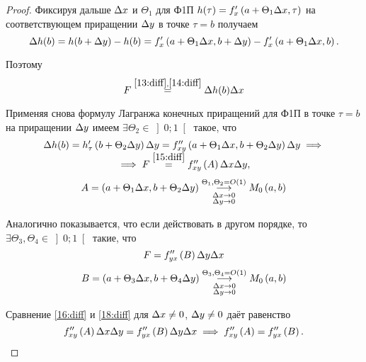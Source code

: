 \documentclass[../../main.tex]{subfiles}
\begin{document}
\begin{proof}
		Фиксируя дальше $\Delta x$ и $\Theta_1$ для Ф1П $h(\tau) = 
		f'_x\left(a+\Theta_1\Delta x, \tau\right)$ на соответствующем приращении 
		$\Delta y$ в точке $\tau = b$ получаем
		\begin{equation}
			\Delta h(b) = h(b + \Delta y) - h(b) = 
			f'_x\left(a + \Theta_1\Delta x, b + \Delta y\right) - 
			f'_x\left(a + \Theta_1\Delta x, b\right).
			\label{14:diff}
		\end{equation}
		
		Поэтому 
		\begin{equation}
			F\overset{\eqref{13:diff},\eqref{14:diff}}{=} \Delta h(b)\Delta x
			\label{15:diff}
		\end{equation}
		
		Применяя снова формулу Лагранжа конечных приращений для Ф1П в точке 
		$\tau = b$ на приращении $\Delta y$ имеем 
		$\exists \Theta_2\in\left]0;1\right[$ такое, что
		\begin{equation}
		\begin{array}{c}
            \Delta h(b) = h'_\tau\left(b + \Theta_2\Delta y\right)\Delta y = 
            f''_{xy}\left(a + \Theta_1\Delta x, b + \Theta_2\Delta y\right)\Delta 
            y\implies \\
			\implies F\overset{\eqref{15:diff}}{=} f''_{xy}\left(A\right)\Delta x
			\Delta y,
			\label{16:diff}
		\end{array}
		\end{equation}
		\begin{equation}
			A = \left(a + \Theta_1\Delta x, b + \Theta_2\Delta y\right)
			\underset{\substack{\Delta x\rightarrow 0\\
			\Delta y\rightarrow 0}}{\overset{\Theta_1, \Theta_2 = O(1)}
			{\longrightarrow}} M_0\left(a, b\right)
			\label{17:diff}
		\end{equation}
		
		Аналогично показывается, что если действовать в другом порядке, то 
		$\exists \Theta_3, \Theta_4\in\left]0;1\right[$ такие, что
		\begin{equation}
			F = f''_{yx}\left(B\right)\Delta y\Delta x
			\label{18:diff}
		\end{equation}
		\begin{equation}
			B = \left(a + \Theta_3\Delta x, b + \Theta_4\Delta y\right)
			\underset{\substack{\Delta x\rightarrow 0\\
			\Delta y\rightarrow 0}}{\overset{\Theta_3,\Theta_4 = O(1)}
			{\longrightarrow}} M_0\left(a, b\right)
			\label{19:diff}
		\end{equation}
		
		Сравнение \eqref{16:diff} и \eqref{18:diff} для $\Delta x\ne0$, 
		$\Delta y\ne0$ даёт равенство
		\[f''_{xy}\left(A\right)\Delta x\Delta y = f''_{yx}\left(B\right)\Delta y\Delta x
		\implies f''_{xy}\left(A\right) = f''_{yx}\left(B\right).\]
		

\end{proof}
\end{document}
